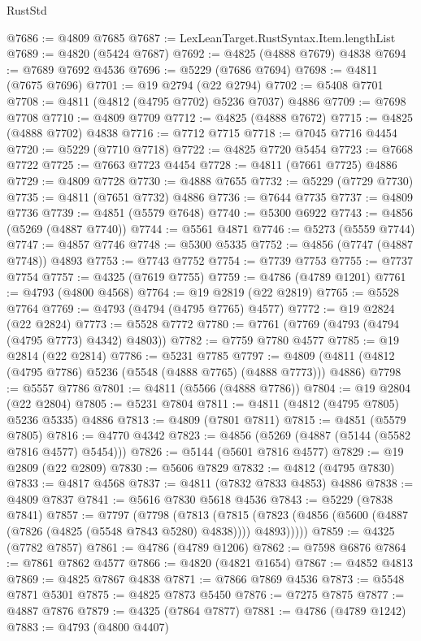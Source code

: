 \begin{lexlean}{RustStd}
\begin{coremodule}
{\begin{coremodule}
{{{{{{{{{{{{{{{{{{{{{{{{{{{{{{{{{{{{{{{{{{{{{{{{{{{{{{{{{{{{{{{{{{{{{{{{{{{{{{{{@7686 := @4809 @7685
@7687 := LexLeanTarget.RustSyntax.Item.lengthList
@7689 := @4820 (@5424 @7687)
@7692 := @4825 (@4888 @7679) @4838
@7694 := @7689 @7692 @4536
@7696 := @5229 (@7686 @7694)
@7698 := @4811 (@7675 @7696)
@7701 := @19 @2794 (@22 @2794)
@7702 := @5408 @7701
@7708 := @4811 (@4812 (@4795 @7702) @5236 @7037) @4886
@7709 := @7698 @7708
@7710 := @4809 @7709
@7712 := @4825 (@4888 @7672)
@7715 := @4825 (@4888 @7702) @4838
@7716 := @7712 @7715
@7718 := @7045 @7716 @4454
@7720 := @5229 (@7710 @7718)
@7722 := @4825 @7720 @5454
@7723 := @7668 @7722
@7725 := @7663 @7723 @4454
@7728 := @4811 (@7661 @7725) @4886
@7729 := @4809 @7728
@7730 := @4888 @7655
@7732 := @5229 (@7729 @7730)
@7735 := @4811 (@7651 @7732) @4886
@7736 := @7644 @7735
@7737 := @4809 @7736
@7739 := @4851 (@5579 @7648)
@7740 := @5300 @6922
@7743 := @4856 (@5269 (@4887 @7740))
@7744 := @5561 @4871
@7746 := @5273 (@5559 @7744)
@7747 := @4857 @7746
@7748 := @5300 @5335
@7752 := @4856 (@7747 (@4887 @7748)) @4893
@7753 := @7743 @7752
@7754 := @7739 @7753
@7755 := @7737 @7754
@7757 := @4325 (@7619 @7755)
@7759 := @4786 (@4789 @1201)
@7761 := @4793 (@4800 @4568)
@7764 := @19 @2819 (@22 @2819)
@7765 := @5528 @7764
@7769 := @4793 (@4794 (@4795 @7765) @4577)
@7772 := @19 @2824 (@22 @2824)
@7773 := @5528 @7772
@7780 := @7761 (@7769 (@4793 (@4794 (@4795 @7773) @4342) @4803))
@7782 := @7759 @7780 @4577
@7785 := @19 @2814 (@22 @2814)
@7786 := @5231 @7785
@7797 := @4809 (@4811 (@4812 (@4795 @7786) @5236 (@5548 (@4888 @7765) (@4888 @7773))) @4886)
@7798 := @5557 @7786
@7801 := @4811 (@5566 (@4888 @7786))
@7804 := @19 @2804 (@22 @2804)
@7805 := @5231 @7804
@7811 := @4811 (@4812 (@4795 @7805) @5236 @5335) @4886
@7813 := @4809 (@7801 @7811)
@7815 := @4851 (@5579 @7805)
@7816 := @4770 @4342
@7823 := @4856 (@5269 (@4887 (@5144 (@5582 @7816 @4577) @5454)))
@7826 := @5144 (@5601 @7816 @4577)
@7829 := @19 @2809 (@22 @2809)
@7830 := @5606 @7829
@7832 := @4812 (@4795 @7830)
@7833 := @4817 @4568
@7837 := @4811 (@7832 @7833 @4853) @4886
@7838 := @4809 @7837
@7841 := @5616 @7830 @5618 @4536
@7843 := @5229 (@7838 @7841)
@7857 := @7797
    (@7798
      (@7813
        (@7815 (@7823 (@4856 (@5600 (@4887 (@7826 (@4825 (@5548 @7843 @5280) @4838)))) @4893)))))
@7859 := @4325 (@7782 @7857)
@7861 := @4786 (@4789 @1206)
@7862 := @7598 @6876
@7864 := @7861 @7862 @4577
@7866 := @4820 (@4821 @1654)
@7867 := @4852 @4813
@7869 := @4825 @7867 @4838
@7871 := @7866 @7869 @4536
@7873 := @5548 @7871 @5301
@7875 := @4825 @7873 @5450
@7876 := @7275 @7875
@7877 := @4887 @7876
@7879 := @4325 (@7864 @7877)
@7881 := @4786 (@4789 @1242)
@7883 := @4793 (@4800 @4407)
}}}}}}}}}}}}}}}}}}}}}}}}}}}}}}}}}}}}}}}}}}}}}}}}}}}}}}}}}}}}}}}}}}}}}}}}}}}}}}}}
\end{coremodule}}
\end{coremodule}
\end{lexlean}
